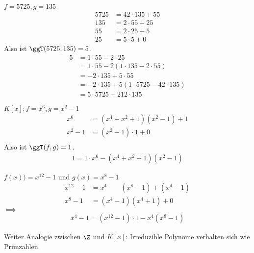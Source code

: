 \documentclass{mycourse}
\begin{document}
\begin{ex}
$f=5725, g=135$
\begin{align*}
5725 &= 42\cdot 135 + 55\\
135 &=  2\cdot 55 + 25\\
55 &= 2\cdot 25 + 5\\
25 &= 5\cdot 5 + 0
\end{align*}
Also ist $\ggT(5725,135)=5$.
\begin{align*}
5&=1\cdot 55 - 2\cdot 25\\
&=1\cdot 55 -2(1\cdot 135 - 2\cdot 55)\\
&=-2\cdot 135 + 5\cdot 55\\
&= -2\cdot 135 + 5(1\cdot 5725 - 42\cdot 135)\\
&= 5\cdot 5725 - 212\cdot 135
\end{align*}
\end{ex}

\begin{ex}
$K[x]: f=x^6, g=x^2-1$
\begin{align*}
x^6 &=(x^4+x^2+1)(x^2-1) + 1\\
x^2-1 &= (x^2-1)\cdot 1 + 0\\
\end{align*}
Also ist $\ggT(f,g)=1$.
\begin{align*}
1 = 1\cdot x^6 - (x^4+x^2+1)(x^2-1)
\end{align*}
\end{ex}

\begin{ex}
$f(x)) = x^{12}-1$ und $g(x)=x^8-1$
\begin{align*}
x^{12}-1 &= x^4\qquad (x^8-1)+(x^4-1)\\
x^8 -1 &= (x^4-1)(x^4+1) +0
\end{align*}
$\implies$
\begin{align*}
x^4-1=(x^{12}-1)\cdot 1 -x^4(x^8-1)
\end{align*}
\end{ex}

Weiter Analogie zwischen $\Z$ und $K[x]$:
Irreduzible Polynome verhalten sich wie Primzahlen.
\end{document}
